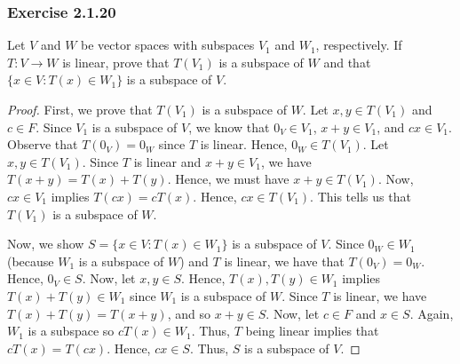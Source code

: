 \subsubsection{Exercise 2.1.20} Let \( V  \) and \( W \) be vector spaces with subspaces \( V_{1}  \) and \( W_{1}  \), respectively. If \( T:V \to W  \) is linear, prove that \( T(V_{1})  \) is a subspace of \( W  \) and that \( \{ x \in V : T(x) \in W_{1} \}   \) is a subspace of \( V  \).
\begin{proof}
First, we prove that \( T(V_{1}) \) is a subspace of \( W  \). Let \( x,y \in T(V_{1}) \) and \( c \in F  \). Since \( V_{1}  \) is a subspace of \( V  \), we know that \( 0_{V} \in V_{1} \), \( x + y \in V_{1} \), and \( cx \in V_{1} \). Observe that \( T(0_{V}) = 0_{W} \) since \( T \) is linear. Hence, \( 0_{W} \in T(V_{1})\). Let \( x,y \in T(V_{1}) \). Since \( T  \) is linear and \( x + y \in V_{1} \), we have \( T(x+y) = T(x) + T(y) \). Hence, we must have \( x + y \in T(V_{1})  \). Now, \( cx \in V_{1} \) implies \( T(cx) = c T(x)    \). Hence, \( cx \in T(V_{1}) \). This tells us that \( T(V_{1}) \) is a subspace of \( W  \).

Now, we show \( S =  \{ x \in V : T(x) \in W_{1} \}  \) is a subspace of \( V  \). Since \( 0_{W} \in W_{1} \) (because \( W_{1}  \) is a subspace of \( W \)) and \( T \) is linear, we have that \( T(0_{V}) = 0_{W}. \) Hence, \( 0_{V} \in S  \). Now, let \( x,y \in S  \). Hence, \( T(x), T(y) \in W_{1} \) implies \( T(x) + T(y) \in W_{1} \) since \( W_{1} \) is a subspace of \( W \). Since \( T  \) is linear, we have \( T(x) + T(y) = T(x+y) \), and so \( x + y \in S \). Now, let \( c \in F  \) and \( x \in S  \). Again, \( W_{1} \) is a subspace so \( c T(x) \in W_{1} \). Thus, \( T \) being linear implies that \( cT(x) = T(cx)\). Hence, \( cx \in S  \). Thus, \( S  \) is a subspace of \( V  \).
\end{proof}

